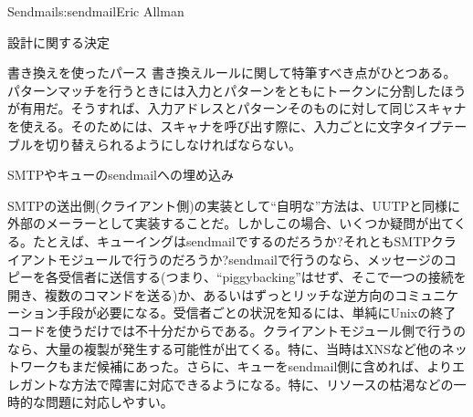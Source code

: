 \begin{aosachapter}{Sendmail}{s:sendmail}{Eric Allman}
\begin{aosasect1}{設計に関する決定}
\begin{aosasect2}{書き換えを使ったパース}
書き換えルールに関して特筆すべき点がひとつある。パターンマッチを行うときには入力とパターンをともにトークンに分割したほうが有用だ。そうすれば、入力アドレスとパターンそのものに対して同じスキャナを使える。そのためには、スキャナを呼び出す際に、入力ごとに文字タイプテーブルを切り替えられるようにしなければならない。

\end{aosasect2}

\begin{aosasect2}{SMTPやキューのsendmailへの埋め込み}

SMTPの送出側(クライアント側)の実装として``自明な''方法は、UUTPと同様に外部のメーラーとして実装することだ。しかしこの場合、いくつか疑問が出てくる。たとえば、キューイングはsendmailでするのだろうか?それともSMTPクライアントモジュールで行うのだろうか?sendmailで行うのなら、メッセージのコピーを各受信者に送信する(つまり、``piggybacking''はせず、そこで一つの接続を開き、複数のコマンドを送る)か、あるいはずっとリッチな逆方向のコミュニケーション手段が必要になる。受信者ごとの状況を知るには、単純にUnixの終了コードを使うだけでは不十分だからである。クライアントモジュール側で行うのなら、大量の複製が発生する可能性が出てくる。特に、当時はXNSなど他のネットワークもまだ候補にあった。さらに、キューをsendmail側に含めれば、よりエレガントな方法で障害に対応できるようになる。特に、リソースの枯渇などの一時的な問題に対応しやすい。


\end{aosasect2}
\end{aosasect1}
\end{aosachapter}
